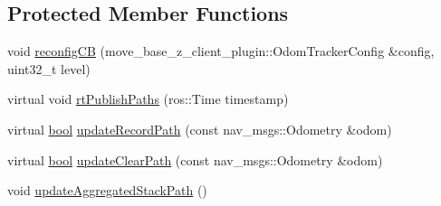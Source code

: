 \subsection*{Protected Member Functions}
\begin{DoxyCompactItemize}
\item 
void \hyperlink{classcl__move__base__z_1_1odom__tracker_1_1OdomTracker_adb06a17455b8d545034d8845706e2886}{reconfig\+CB} (move\+\_\+base\+\_\+z\+\_\+client\+\_\+plugin\+::\+Odom\+Tracker\+Config \&config, uint32\+\_\+t level)
\item 
virtual void \hyperlink{classcl__move__base__z_1_1odom__tracker_1_1OdomTracker_a8f728f85d1f3f49f4b94e37052a59d6d}{rt\+Publish\+Paths} (ros\+::\+Time timestamp)
\item 
virtual \hyperlink{classbool}{bool} \hyperlink{classcl__move__base__z_1_1odom__tracker_1_1OdomTracker_a77a66083573c6bef726d77447fb53349}{update\+Record\+Path} (const nav\+\_\+msgs\+::\+Odometry \&odom)
\item 
virtual \hyperlink{classbool}{bool} \hyperlink{classcl__move__base__z_1_1odom__tracker_1_1OdomTracker_abe7ba4dbf014e1f2c64b5806ce42c073}{update\+Clear\+Path} (const nav\+\_\+msgs\+::\+Odometry \&odom)
\item 
void \hyperlink{classcl__move__base__z_1_1odom__tracker_1_1OdomTracker_a7922f1e1e688a2ed62d32d9914985a9f}{update\+Aggregated\+Stack\+Path} ()
\end{DoxyCompactItemize}
